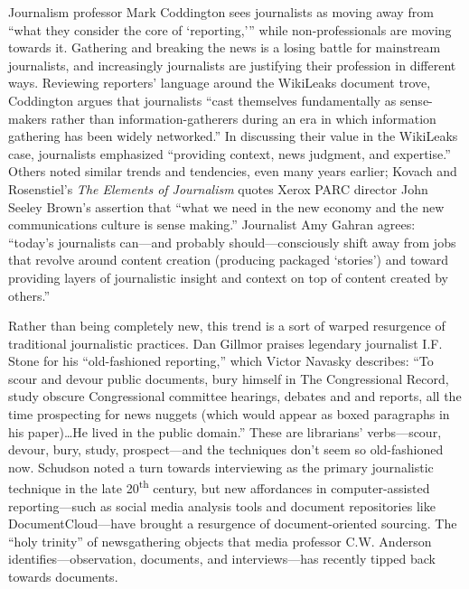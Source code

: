Journalism professor Mark Coddington sees journalists as moving away from ``what they consider the core of `reporting,'\thinspace'' while non-professionals are moving towards it.\autocite[682]{coddington_defending_2014} Gathering and breaking the news is a losing battle for mainstream journalists, and increasingly journalists are justifying their profession in different ways. Reviewing reporters' language around the WikiLeaks document trove, Coddington argues that journalists ``cast themselves fundamentally as sense-makers rather than information-gatherers during an era in which information gathering has been widely networked.''\autocite[678]{coddington_defending_2014} In discussing their value in the WikiLeaks case, journalists emphasized ``providing context, news judgment, and expertise.''\autocite[689]{coddington_defending_2014} Others noted similar trends and tendencies, even many years earlier; Kovach and Rosenstiel's \emph{The Elements of Journalism} quotes Xerox PARC director John Seeley Brown's assertion that ``what we need in the new economy and the new communications culture is sense making.''\autocite{kovach_elements_2001} Journalist Amy Gahran agrees: ``today's journalists can---and probably should---consciously shift away from jobs that revolve around content creation (producing packaged `stories') and toward providing layers of journalistic insight and context on top of content created by others.''\autocite{gahran_swimming_2008}

Rather than being completely new, this trend is a sort of warped resurgence of traditional journalistic practices. Dan Gillmor praises legendary journalist I.F. Stone for his ``old-fashioned reporting,'' which Victor Navasky describes: ``To scour and devour public documents, bury himself in The Congressional Record, study obscure Congressional committee hearings, debates and and reports, all the time prospecting for news nuggets (which would appear as boxed paragraphs in his paper)\ldots He lived in the public domain.''\autocite[3-4]{gillmor_we_2006} These are librarians' verbs---scour, devour, bury, study, prospect---and the techniques don't seem so old-fashioned now. Schudson noted a turn towards interviewing as the primary journalistic technique in the late 20\textsuperscript{th} century, but new affordances in computer-assisted reporting---such as social media analysis tools and document repositories like DocumentCloud---have brought a resurgence of document-oriented sourcing. The ``holy trinity'' of newsgathering objects that media professor C.W. Anderson identifies---observation, documents, and interviews---has recently tipped back towards documents.\autocite[680]{coddington_defending_2014}

